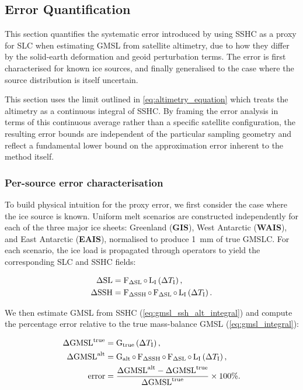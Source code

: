 \subsection{Error Quantification}

This section quantifies the systematic error introduced by using SSHC as a proxy for SLC when estimating GMSL from satellite altimetry, due to how they differ by the solid-earth deformation and geoid perturbation terms. The error is first characterised for known ice sources, and finally generalised to the case where the source distribution is itself uncertain.

This section uses the limit outlined in \autoref{eq:altimetry_equation} which treats the altimetry as a continuous integral of SSHC. By framing the error analysis in terms of this continuous average rather than a specific satellite configuration, the resulting error bounds are independent of the particular sampling geometry and reflect a fundamental lower bound on the approximation error inherent to the method itself.

\subsubsection{Per-source error characterisation}


To build physical intuition for the proxy error, we first consider the case where the ice source is known. Uniform melt scenarios are constructed independently for each of the three major ice sheets: Greenland (\textbf{GIS}), West Antarctic (\textbf{WAIS}), and East Antarctic (\textbf{EAIS}), normalised to produce 1~mm of true GMSLC. For each scenario, the ice load is propagated through operators to yield the corresponding SLC and SSHC fields:

\begin{align}
    \Delta \mathrm{SL} &= \operatorname{{F}}_{{\Delta \mathrm{SL}}} \circ \operatorname{{L}}_{{\text{I}}} \left(\Delta T_\text{I}\right), \\
    \Delta \mathrm{SSH} &= \operatorname{{F}}_{{\Delta \mathrm{SSH}}} \circ \operatorname{{F}}_{{\Delta \mathrm{SL}}} \circ \operatorname{{L}}_{{\text{I}}} \left(\Delta T_\text{I}\right).
\end{align}

We then estimate GMSL from SSHC (\autoref{eq:gmsl_ssh_alt_integral}) and compute the percentage error relative to the true mass-balance GMSL (\autoref{eq:gmsl_integral}):

\begin{align}
    \Delta \mathrm{GMSL}^{\mathrm{true}} &= \operatorname{{G}}_{{\text{true}}} \left(\Delta T_\text{I}\right),\\
    \Delta \mathrm{GMSL}^{\mathrm{alt}} &= \operatorname{{G}}_{{\text{alt}}} \circ \operatorname{{F}}_{{\Delta \mathrm{SSH}}} \circ \operatorname{{F}}_{{\Delta \mathrm{SL}}} \circ \operatorname{{L}}_{{\text{I}}} \left(\Delta T_\text{I}\right),\\
    \text{error} &= \frac{\Delta \mathrm{GMSL}^{\mathrm{alt}} - \Delta \mathrm{GMSL}^{\mathrm{true}}}{\Delta \mathrm{GMSL}^{\mathrm{true}}} \times 100\%.
\end{align}


